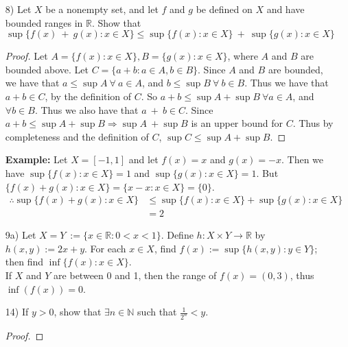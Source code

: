 \documentclass[12pt,letterpaper]{article}
\theoremstyle{case}
\begin{document}
\begin{enumerate}
\begin{enumerate}
\begin{proof}
				\\\\Since $u = \sup S$, we have that $\exists s_0 \in S\ \text{s.t.}\ \sqrt{w} \leq s_0$.
				\\$\Rightarrow w < s^2_0$, which contradicts the fact that $w$ is an upper bound of $T$.
				\\\\$\therefore \sup T = u^2$.
			\end{proof}
		\textbf{Example:} Let $S:= (-2,1)$. Then $\sup S = 1$. Then $T:=(1,4)$, which yields $\sup T = 4$, and $4 \neq 1$.
			\item [8)] Let $X$ be a nonempty set, and let $f$ and $g$ be defined on $X$ and have bounded ranges in $\mathbb{R}$. Show that $$\sup\{f(x)\ +\ g(x): x \in X\} \leq \sup\{f(x): x \in X\}\ + \ \sup\{g(x): x \in X\}$$
			\begin{proof}
				Let $A=\{f(x): x \in X\}, B=\{g(x): x \in X\}$, where $A$ and $B$ are bounded above. Let $C=\{a+b:a \in A, b \in B\}$. Since $A$ and $B$ are bounded, we have that $a \leq \sup A\  \forall\  a \in A$, and $b \leq \sup B\  \forall\  b \in B$. Thus we have that $a + b \in C$, by the definition of $C$. So $a+b\leq \sup A + \sup B \ \forall a \in A$, and $\forall b \in B$. Thus we also have that $a\ +\ b \in C$. Since $a+b \leq \sup A + \sup B \Rightarrow \sup A \ + \sup B$ is an upper bound for $C$. Thus by completeness and the definition of $C$, $\sup C \leq \sup A + \sup B$.
			\end{proof}
		\textbf{Example:} Let $X=[-1,1]$ and let $f(x)=x$ and $g(x)=-x$. Then we have $\sup \{f(x):x \in X\} = 1$ and $\sup \{g(x): x \in X\} = 1$. But $\{f(x) + g(x): x \in X\} = \{x - x: x \in X\} = \{0\}$.\\
		\begin{align*}
		\therefore \sup\{f(x) + g(x): x \in X\} &\leq \sup \{f(x):x \in X\} + \sup \{g(x): x \in X\} \\ &= 2
		\end{align*}
		\item [9a)] Let $X=Y\ :=\{x \in \mathbb{R}: 0 < x < 1\}$. Define $h:X \times Y \rightarrow \mathbb{R}$ by $h(x,y) := 2x + y$. For each $x \in X$, find $f(x) := \sup \{h(x,y): y \in Y \}$; then find $\inf \{f(x): x \in X\}$.\\
		If $X$ and $Y$ are between 0 and 1, then the range of $f(x) = (0,3)$, thus $\inf(f(x)) = 0$.
		\item[14)] If $y > 0$, show that $\exists n \in \mathbb{N}$ such that $\frac{1}{2^n} < y$.
		\begin{proof}

\end{proof}
\end{enumerate}
\end{enumerate}
\end{document}
